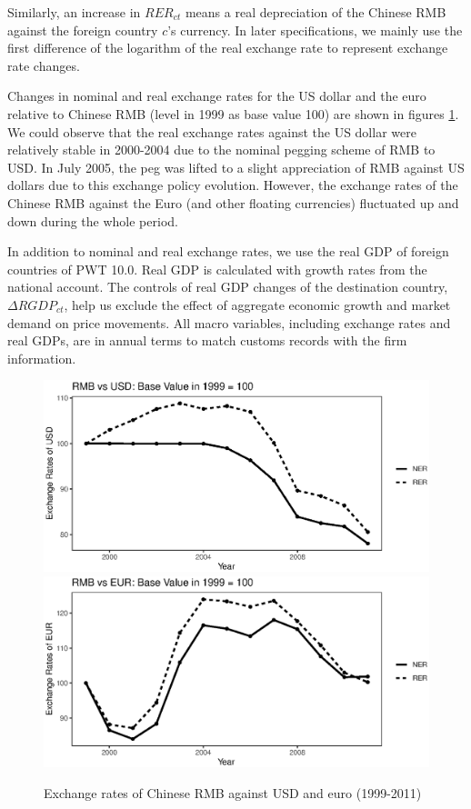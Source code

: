 Similarly, an increase in $RER_{ct}$ means a real depreciation of the Chinese RMB against the foreign country $c$'s currency. In later specifications, we mainly use the first difference of the logarithm of the real exchange rate to represent exchange rate changes.

Changes in nominal and real exchange rates for the US dollar and the euro relative to Chinese RMB (level in 1999 as base value 100) are shown in figures \ref{fig.ER}. We could observe that the real exchange rates against the US dollar were relatively stable in 2000-2004 due to the nominal pegging scheme of RMB to USD. In July 2005, the peg was lifted to a slight appreciation of RMB against US dollars due to this exchange policy evolution. However, the exchange rates of the Chinese RMB against the Euro (and other floating currencies) fluctuated up and down during the whole period. 

In addition to nominal and real exchange rates, we use the real GDP of foreign countries of PWT 10.0. Real GDP is calculated with growth rates from the national account. The controls of real GDP changes of the destination country, $\Delta RGDP_{ct}$, help us exclude the effect of aggregate economic growth and market demand on price movements. All macro variables, including exchange rates and real GDPs, are in annual terms to match customs records with the firm information.

\begin{figure}[htbp]
	\centering
	\includegraphics[width=1\textwidth]{R/USD.eps}
	\includegraphics[width=1\textwidth]{R/EUR.eps}
	\caption{Exchange rates of Chinese RMB against USD and euro (1999-2011)}
	\label{fig.ER}
\end{figure}

